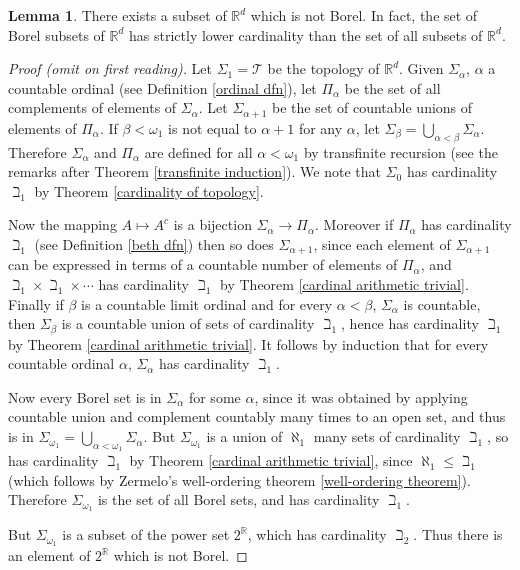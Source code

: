 \documentclass[12pt]{book}
\newcommand{\RR}{\mathbb{R}}
\theoremstyle{definition}
\newtheorem{lemma}[theorem]{Lemma}
\begin{document}
\begin{lemma}
\label{Borel sigma algebra}
There exists a subset of $\RR^d$ which is not Borel.
In fact, the set of Borel subsets of $\RR^d$ has strictly lower cardinality than the set of all subsets of $\RR^d$.
\end{lemma}
\begin{proof}[Proof (omit on first reading)]
Let $\Sigma_1 = \mathcal T$ be the topology of $\RR^d$.
Given $\Sigma_\alpha$, $\alpha$ a countable ordinal (see Definition \ref{ordinal dfn}), let $\Pi_\alpha$ be the set of all complements of elements of $\Sigma_\alpha$.
Let $\Sigma_{\alpha+1}$ be the set of countable unions of elements of $\Pi_\alpha$.
If $\beta < \omega_1$ is not equal to $\alpha+1$ for any $\alpha$, let $\Sigma_\beta = \bigcup_{\alpha < \beta} \Sigma_\alpha$.
Therefore $\Sigma_\alpha$ and $\Pi_\alpha$ are defined for all $\alpha < \omega_1$ by transfinite recursion (see the remarks after Theorem \ref{transfinite induction}).
We note that $\Sigma_0$ has cardinality $\beth_1$ by Theorem \ref{cardinality of topology}.

Now the mapping $A \mapsto A^c$ is a bijection $\Sigma_\alpha \to \Pi_\alpha$.
Moreover if $\Pi_\alpha$ has cardinality $\beth_1$ (see Definition \ref{beth dfn}) then so does $\Sigma_{\alpha+1}$, since each element of $\Sigma_{\alpha+1}$ can be expressed in terms of a countable number of elements of $\Pi_\alpha$, and $\beth_1 \times \beth_1 \times \cdots$ has cardinality $\beth_1$ by Theorem \ref{cardinal arithmetic trivial}.
Finally if $\beta$ is a countable limit ordinal and for every $\alpha < \beta$, $\Sigma_\alpha$ is countable, then $\Sigma_\beta$ is a countable union of sets of cardinality $\beth_1$, hence has cardinality $\beth_1$ by Theorem \ref{cardinal arithmetic trivial}.
It follows by induction that for every countable ordinal $\alpha$, $\Sigma_\alpha$ has cardinality $\beth_1$.

Now every Borel set is in $\Sigma_\alpha$ for some $\alpha$, since it was obtained by applying countable union and complement countably many times to an open set, and thus is in $\Sigma_{\omega_1} = \bigcup_{\alpha < \omega_1} \Sigma_\alpha$.
But $\Sigma_{\omega_1}$ is a union of $\aleph_1$ many sets of cardinality $\beth_1$, so has cardinality $\beth_1$ by Theorem \ref{cardinal arithmetic trivial},
since $\aleph_1 \leq \beth_1$ (which follows by Zermelo's well-ordering theorem \ref{well-ordering theorem}).
Therefore $\Sigma_{\omega_1}$ is the set of all Borel sets, and has cardinality $\beth_1$.

But $\Sigma_{\omega_1}$ is a subset of the power set $2^\RR$, which has cardinality $\beth_2$. Thus there is an element of $2^\RR$ which is not Borel.
\end{proof}
\end{document}
